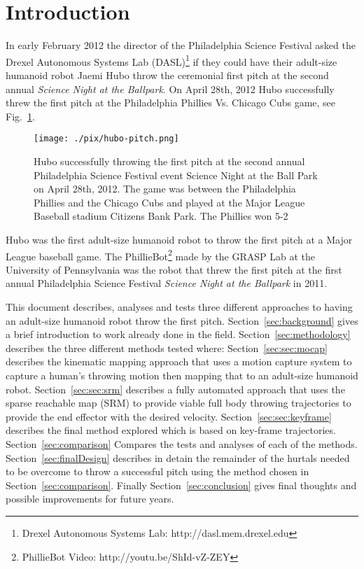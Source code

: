 \section{Introduction}
In early February 2012 the director of the Philadelphia Science Festival asked the Drexel Autonomous Systems Lab (DASL)\footnote{Drexel Autonomous Systems Lab: http://dasl.mem.drexel.edu}\label{foot:dasl} if they could have their adult-size humanoid robot Jaemi Hubo throw the ceremonial first pitch at the second annual \textit{Science Night at the Ballpark}.  On April 28th, 2012 Hubo successfully threw the first pitch at the Philadelphia Phillies Vs. Chicago Cubs game, see Fig.~\ref{fig:hubo-throw}.  

\begin{figure}[t]
  \centering
\texttt{[image: ./pix/hubo-pitch.png]}
  \caption{Hubo successfully throwing the first pitch at the second annual Philadelphia Science Festival event Science Night at the Ball Park on April 28th, 2012.  The game was between the Philadelphia Phillies and the Chicago Cubs and played at the Major League Baseball stadium Citizens Bank Park.  The Phillies won 5-2}
  \label{fig:hubo-throw}
\end{figure}

Hubo was the first adult-size humanoid robot to throw the first pitch at a Major League baseball game.  The PhillieBot\footnote{PhillieBot Video: http://youtu.be/ShId-vZ-ZEY} made by the GRASP Lab at the University of Pennsylvania was the robot that threw the first pitch at the first annual Philadelphia Science Festival \textit{Science Night at the Ballpark} in 2011.  

This document describes, analyses and tests three different approaches to having an adult-size humanoid robot throw the first pitch.  
Section~\ref{sec:background} gives a brief introduction to work already done in the field.
Section~\ref{sec:methodology} describes the three different methods tested where:
Section~\ref{sec:sec:mocap} describes the kinematic mapping approach that uses a motion capture system to capture a human's throwing motion then mapping that to an adult-size humanoid robot.  
Section~\ref{sec:sec:srm} describes a fully automated approach that uses the sparse reachable map (SRM) to provide viable full body throwing trajectories to provide the end effector with the desired velocity\cite{dlofaro-srm}.
Section~\ref{sec:sec:keyframe} describes the final method explored which is based on key-frame trajectories.
Section~\ref{sec:comparison} Compares the tests and analyses of each of the methods.
Section~\ref{sec:finalDesign} describes in detain the remainder of the hurtals needed to be overcome to throw a successful pitch using the method chosen in Section~\ref{sec:comparison}.
Finally Section~\ref{sec:conclusion} gives final thoughts and possible improvements for future years.


